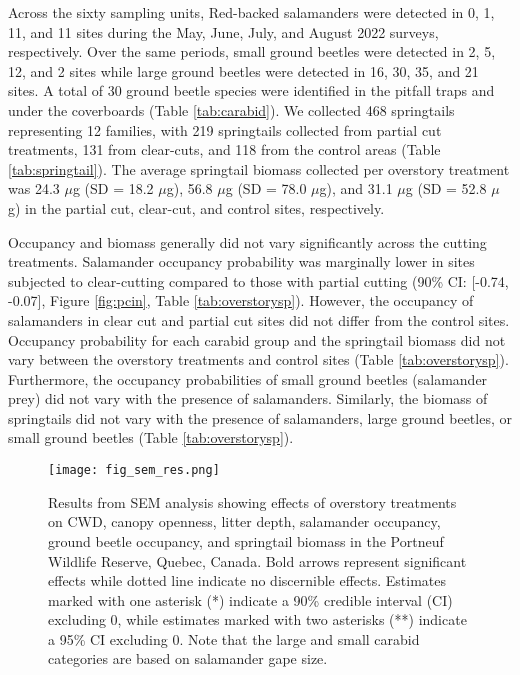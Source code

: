 \vspace{10pt}

Across the sixty sampling units, Red-backed salamanders were detected in 0, 1, 11, and 11 sites during the May, June, July, and August 2022 surveys, respectively. 
Over the same periods, small ground beetles were detected in 2, 5, 12, and 2 sites while large ground beetles were detected in 16, 30, 35, and 21 sites.
A total of 30 ground beetle species were identified in the pitfall traps and under the coverboards (Table \ref{tab:carabid}). 
We collected 468 springtails representing 12 families, with 219 springtails collected from partial cut treatments, 131 from clear-cuts, and 118 from the control areas (Table \ref{tab:springtail}). 
The average springtail biomass collected per overstory treatment was 24.3 $\mu$g (SD = 18.2 $\mu$g), 56.8 $\mu$g (SD = 78.0 $\mu$g), and 31.1 $\mu$g (SD = 52.8 $\mu$g) in the partial cut, clear-cut, and control sites, respectively. 

Occupancy and biomass generally did not vary significantly across the cutting treatments. 
Salamander occupancy probability was marginally lower in sites subjected to clear-cutting compared to those with partial cutting (90\% CI: [-0.74, -0.07], Figure \ref{fig:pcin}, Table \ref{tab:overstorysp}). 
However, the occupancy of salamanders in clear cut and partial cut sites did not differ from the control sites. 
Occupancy probability for each carabid group and the springtail biomass did not vary between the overstory treatments and control sites (Table \ref{tab:overstorysp}). 
Furthermore, the occupancy probabilities of small ground beetles (salamander prey) did not vary with the presence of salamanders. 
Similarly, the biomass of springtails did not vary with the presence of salamanders, large ground beetles, or small ground beetles (Table \ref{tab:overstorysp}).

\begin{figure}[h!]
	\centering
	\texttt{[image: fig\_sem\_res.png]}
	\caption[Results from structural equation modeling analysis revealing effects of overstory treatments on coarse woody debris volume,
  canopy openness, litter depth, salamander occupancy, ground beetle occupancy, and springtail biomass.]
  {Results from SEM analysis showing effects of overstory treatments on CWD, 
  canopy openness, litter depth, salamander occupancy, ground beetle occupancy, and springtail biomass in the Portneuf Wildlife Reserve, 
  Quebec, Canada. Bold arrows represent significant effects while dotted line indicate no discernible effects. 
  Estimates marked with one asterisk (*) indicate a 90\% credible interval (CI) excluding 0, while estimates marked with two asterisks (**) indicate a 95\% CI excluding 0. 
  Note that the large and small carabid categories are based on salamander gape size.}
	\label{fig:SEMres}
\end{figure}  

